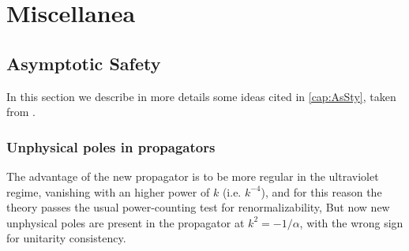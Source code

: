 
\chapter{Miscellanea}
\label{cap:misc}

\minitoc
\adjustmtc


\section{Asymptotic Safety}

In this section we describe in more details some ideas cited in \cref{cap:AsSty}, taken from \cite{Weinberg1979}.

\subsection{Unphysical poles in propagators}
\label{ssec:upoles}

The advantage of the new propagator is to be more regular in the ultraviolet regime, vanishing with an higher power of $ k $ (i.e. $ k^{-4} $), and for this reason the theory passes the usual power-counting test for renormalizability,
But now new unphysical poles are present in the propagator at $ k^2 = -1/{\alpha} $, with the wrong sign for unitarity consistency.
